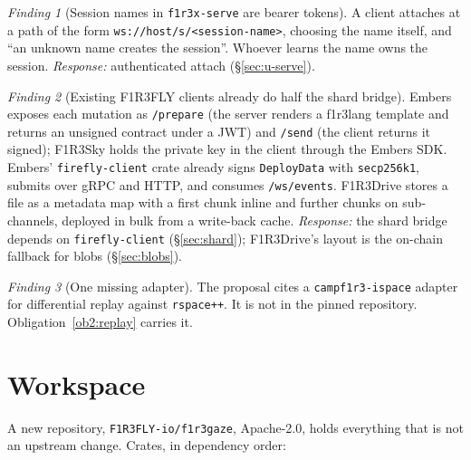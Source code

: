 \documentclass[11pt]{article}
\theoremstyle{definition}
\theoremstyle{remark}
\newcommand{\fl}{f1r3lang}
\newcommand{\code}[1]{\texttt{#1}}
\newtheorem{finding}{Finding}
\begin{document}
\begin{finding}[Session names in \code{f1r3x-serve} are bearer tokens]\label{f:serve}
A client attaches at a path of the form
\code{ws://host/s/<session-name>}, choosing the name itself,
and ``an unknown name creates the session''. Whoever learns the name owns the
session. \emph{Response:} authenticated attach (\S\ref{sec:u-serve}).
\end{finding}

\begin{finding}[Existing F1R3FLY clients already do half the shard bridge]\label{f:embers}
Embers exposes each mutation as \code{/prepare} (the server renders a \fl{} template
and returns an unsigned contract under a JWT) and \code{/send} (the client returns it
signed); F1R3Sky holds the private key in the client through the Embers SDK.
Embers' \code{firefly-client} crate already signs \code{DeployData} with
\code{secp256k1}, submits over gRPC and HTTP, and consumes \code{/ws/events}.
F1R3Drive stores a file as a metadata map with a first chunk inline and further
chunks on sub-channels, deployed in bulk from a write-back cache.
\emph{Response:} the shard bridge depends on \code{firefly-client}
(\S\ref{sec:shard}); F1R3Drive's layout is the on-chain fallback for blobs
(\S\ref{sec:blobs}).
\end{finding}

\begin{finding}[One missing adapter]
The proposal cites a \code{campf1r3-ispace} adapter for differential replay against
\code{rspace++}. It is not in the pinned repository. Obligation~\ref{ob2:replay}
carries it.
\end{finding}

\section{Workspace}\label{sec:workspace}

A new repository, \code{F1R3FLY-io/f1r3gaze}, Apache-2.0, holds everything that is
not an upstream change. Crates, in dependency order:
\end{document}
